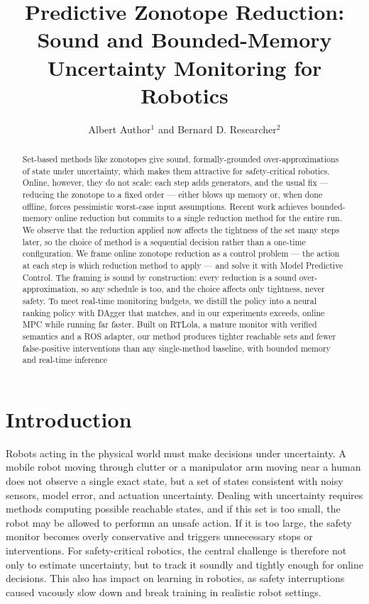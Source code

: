 \documentclass[letterpaper, 10 pt, conference]{ieeeconf}  %
\title{\LARGE \bf
Predictive Zonotope Reduction: Sound and Bounded-Memory Uncertainty Monitoring for Robotics
}
\author{Albert Author$^{1}$ and Bernard D. Researcher$^{2}$%
}
\begin{document}
\maketitle
\thispagestyle{empty}
\pagestyle{empty}


\begin{abstract}
Set-based methods like zonotopes give sound, formally-grounded over-approximations of state under uncertainty, which makes them attractive for safety-critical robotics. Online, however, they do not scale: each step adds generators, and the usual fix — reducing the zonotope to a fixed order — either blows up memory or, when done offline, forces pessimistic worst-case input assumptions. Recent work achieves bounded-memory online reduction but commits to a single reduction method for the entire run. We observe that the reduction applied now affects the tightness of the set many steps later, so the choice of method is a sequential decision rather than a one-time configuration. We frame online zonotope reduction as a control problem — the action at each step is which reduction method to apply — and solve it with Model Predictive Control. The framing is sound by construction: every reduction is a sound over-approximation, so any schedule is too, and the choice affects only tightness, never safety. To meet real-time monitoring budgets, we distill the policy into a neural ranking policy with DAgger that matches, and in our experiments exceeds, online MPC while running far faster. Built on RTLola, a mature monitor with verified semantics and a ROS adapter, our method produces tighter reachable sets and fewer false-positive interventions than any single-method baseline, with bounded memory and real-time inference 
\end{abstract}


\section{Introduction}
Robots acting in the physical world must make decisions under uncertainty. A mobile robot moving through clutter or a manipulator arm moving near a human does not observe a single exact state, but a set of states consistent with noisy sensors, model error, and actuation uncertainty.  Dealing with uncertainty requires methods computing possible reachable states, and if this set is too small, the robot may be allowed to performn an unsafe action. If it is too large, the safety monitor becomes overly conservative and triggers unnecessary stops or interventions. For safety-critical robotics, the central challenge is therefore not only to estimate uncertainty, but to track it soundly and tightly enough for online decisions. This also has impact on learning in robotics, as safety interruptions caused vacously slow down and break training in realistic robot settings.
\end{document}
